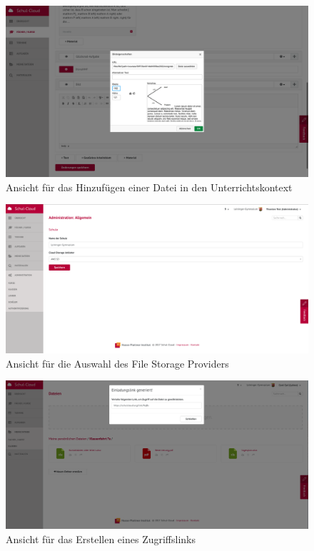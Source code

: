 \begin{figure}[H]
	\centering
	\includegraphics[width=1\linewidth]{images/screenCkEditor}
	\caption{Ansicht für das Hinzufügen einer Datei in den Unterrichtskontext}
	\label{fig:screenCkEditor}
\end{figure}

\begin{figure}[H]
	\centering
	\includegraphics[width=1\linewidth]{images/adminFileStorage}
	\caption{Ansicht für die Auswahl des File Storage Providers}
	\label{fig:adminFileStorage}
\end{figure}

\begin{figure}[H]
	\centering
	\includegraphics[width=1\linewidth]{images/sharingfileui}
	\caption{Ansicht für das Erstellen eines Zugriffslinks}
	\label{fig:sharingfileui}
\end{figure}
\clearpage